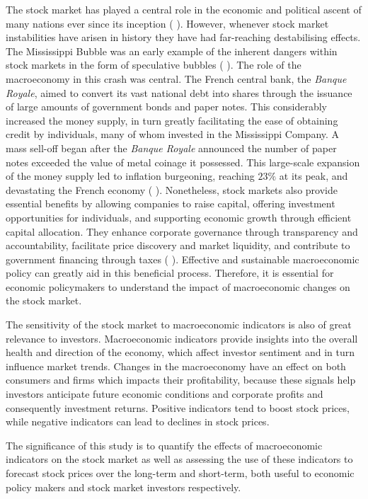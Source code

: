 \documentclass[11pt,a4paper]{article}
\newcommand{\citeboth}[1]{\citeauthor{#1} \citep{#1}}
\begin{document}
The stock market has played a central role in the economic and 
political ascent of many nations ever since its inception (\citeboth{levine2002}).  
However, whenever stock market instabilities have arisen in history they 
have had far-reaching destabilising effects. The Mississippi Bubble was 
an early example of the inherent dangers within stock markets in the form of 
speculative bubbles (\citeboth{mississippibubble}). The role of
the macroeconomy in this crash was central. The French central bank, the 
\textit{Banque Royale}, aimed to convert its vast national debt into shares through the issuance of large 
amounts of government bonds and paper notes. This considerably increased the money supply, in turn 
greatly facilitating the ease of obtaining credit by individuals, many of whom invested in the Mississippi Company.
A mass sell-off began after the \textit{Banque Royale} announced the number of paper notes exceeded the 
value of metal coinage it possessed. This large-scale expansion of the money supply led to 
inflation burgeoning, reaching $23\%$ at its peak, and devastating the French economy (\citeboth{moen2001john}).  Nonetheless, stock markets also provide essential benefits by allowing companies to 
raise capital, offering investment opportunities for individuals, and 
supporting economic growth through efficient capital allocation. 
They enhance corporate governance through transparency and accountability, 
facilitate price discovery and market liquidity, and contribute to government 
financing through taxes (\citeboth{shahbaz2016}). Effective and sustainable
macroeconomic policy can greatly aid in this beneficial process. Therefore, it is essential 
for economic policymakers to understand the impact of macroeconomic changes 
on the stock market. 


The sensitivity of the stock market to macroeconomic indicators is also of great 
relevance to investors. Macroeconomic indicators provide 
insights into the overall health and direction of the 
economy, which affect investor sentiment and in turn influence market trends.
Changes in the macroeconomy have an effect on both consumers and firms 
which impacts their profitability, because these signals 
help investors anticipate future economic conditions and corporate profits
and consequently investment returns. Positive indicators tend to boost stock prices, while 
negative indicators can lead to declines in stock prices.

The significance of this study is to quantify the effects of macroeconomic 
indicators on the stock market as well as assessing the use of these indicators 
to forecast stock prices over the long-term and short-term, both useful to 
economic policy makers and stock market investors respectively.
\end{document}
